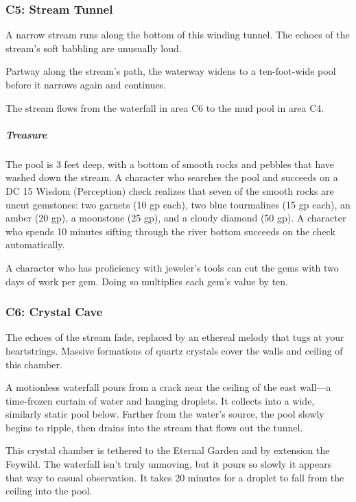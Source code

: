 \documentclass[10pt,a4paper,twoside,bg=print,twocolumn,openany,nodeprecatedcode]{dndbook}
\begin{document}
\subsubsection{C5: Stream Tunnel}
\begin{DndReadAloud}{}
A narrow stream runs along the bottom of this winding tunnel. The echoes of the stream's soft babbling are unusually loud.

Partway along the stream's path, the waterway widens to a ten-foot-wide pool before it narrows again and continues.

\end{DndReadAloud}

The stream flows from the waterfall in area C6 to the mud pool in area C4.

\subparagraph{Treasure}
The pool is 3 feet deep, with a bottom of smooth rocks and pebbles that have washed down the stream. A character who searches the pool and succeeds on a DC 15 Wisdom (Perception) check realizes that seven of the smooth rocks are uncut gemstones: two garnets (10 gp each), two blue tourmalines (15 gp each), an amber (20 gp), a moonstone (25 gp), and a cloudy diamond (50 gp). A character who spends 10 minutes sifting through the river bottom succeeds on the check automatically.

A character who has proficiency with jeweler's tools can cut the gems with two days of work per gem. Doing so multiplies each gem's value by ten.

\subsubsection{C6: Crystal Cave}
\begin{DndReadAloud}{}
The echoes of the stream fade, replaced by an ethereal melody that tugs at your heartstrings. Massive formations of quartz crystals cover the walls and ceiling of this chamber.

A motionless waterfall pours from a crack near the ceiling of the east wall—a time-frozen curtain of water and hanging droplets. It collects into a wide, similarly static pool below. Farther from the water's source, the pool slowly begins to ripple, then drains into the stream that flows out the tunnel.

\end{DndReadAloud}

This crystal chamber is tethered to the Eternal Garden and by extension the Feywild. The waterfall isn't truly unmoving, but it pours so slowly it appears that way to casual observation. It takes 20 minutes for a droplet to fall from the ceiling into the pool.
\end{document}
